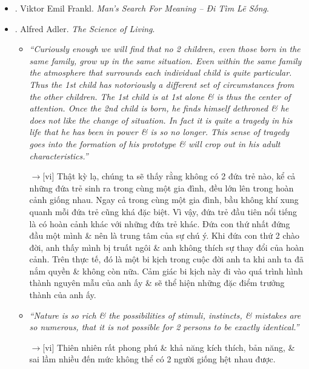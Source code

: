 \documentclass[12pt,twoside]{book}
\begin{document}
\begin{itemize}
\begin{itemize}
		{\sf[en]$\to$[vi]} Nếu cuộc sống có ý nghĩa gì đó thì đau khổ cũng phải có ý nghĩa. Đau khổ là một phần không thể xóa bỏ được của cuộc sống, kể cả số phận \& cái chết. Không có đau khổ \& cái chết, cuộc sống con người không thể trọn vẹn.
	\end{itemize}
	Với bản dịch tiếng Việt:
	\item \cite{Frankl_meaning_VN}. {\sc Viktor Emil Frankl}. {\it Man's Search For Meaning -- Đi Tìm Lẽ Sống}.
	\item \cite{Adler_science_living}. {\sc Alfred Adler}. {\it The Science of Living}.
	\begin{itemize}
		\item {\it``Curiously enough we will find that no 2 children, even those born in the same family, grow up in the same situation. Even within the same family the atmosphere that surrounds each individual child is quite particular. Thus the 1st child has notoriously a different set of circumstances from the other children. The 1st child is at 1st alone \& is thus the center of attention. Once the 2nd child is born, he finds himself dethroned \& he does not like the change of situation. In fact it is quite a tragedy in his life that he has been in power \& is so no longer. This sense of tragedy goes into the formation of his prototype \& will crop out in his adult characteristics.''}
		
		{\sf[en]$\to$[vi]} Thật kỳ lạ, chúng ta sẽ thấy rằng không có 2 đứa trẻ nào, kể cả những đứa trẻ sinh ra trong cùng một gia đình, đều lớn lên trong hoàn cảnh giống nhau. Ngay cả trong cùng một gia đình, bầu không khí xung quanh mỗi đứa trẻ cũng khá đặc biệt. Vì vậy, đứa trẻ đầu tiên nổi tiếng là có hoàn cảnh khác với những đứa trẻ khác. Đứa con thứ nhất đứng đầu một mình \& nên là trung tâm của sự chú ý. Khi đứa con thứ 2 chào đời, anh thấy mình bị truất ngôi \& anh không thích sự thay đổi của hoàn cảnh. Trên thực tế, đó là một bi kịch trong cuộc đời anh ta khi anh ta đã nắm quyền \& không còn nữa. Cảm giác bi kịch này đi vào quá trình hình thành nguyên mẫu của anh ấy \& sẽ thể hiện những đặc điểm trưởng thành của anh ấy.
		
		\item {\it``Nature is so rich \& the possibilities of stimuli, instincts, \& mistakes are so numerous, that it is not possible for 2 persons to be exactly identical.''}
		
		{\sf[en]$\to$[vi]} Thiên nhiên rất phong phú \& khả năng kích thích, bản năng, \& sai lầm nhiều đến mức không thể có 2 người giống hệt nhau được.
		

\end{itemize}
\end{itemize}
\end{document}
